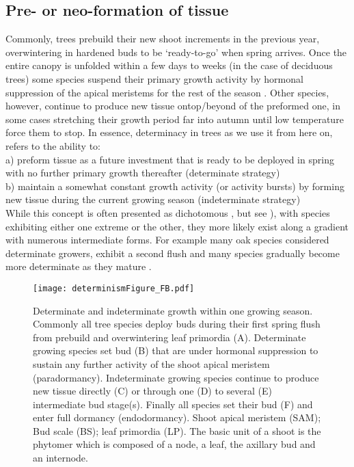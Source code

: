 \documentclass{article}
\begin{document}
	\subsection*{Pre- or neo-formation of tissue}
	Commonly, trees prebuild their new shoot increments in the previous year, overwintering in hardened buds to be `ready-to-go' when spring arrives. Once the entire canopy is unfolded within a few days to weeks (in the case of deciduous trees) some species suspend their primary growth activity by hormonal suppression of the apical meristems for the rest of the season \citep[paradormancy,][]{langEndoParaEcodormancy1987}.  Other species, however, continue to produce new tissue ontop/beyond of the preformed one, in some cases stretching their growth period far into autumn until low temperature force them to stop. In essence, determinacy in trees as we use it from here on, refers to the ability to:\\
	a) preform tissue as a future investment that is ready to be deployed in spring with no further primary growth thereafter (determinate strategy)\\
	b) maintain a somewhat constant growth activity (or activity bursts) by forming new tissue during the current growing season (indeterminate strategy)\\

While this concept is often presented as dichotomous \citep{kozlowskiGrowthControlWoody1997, lechowiczWhyTemperateDeciduous1984a}, but see \citealp{kikuzawaLeafSurvivalWoody1983, damascosBudCompositionBranching2005}), with species exhibiting either one extreme or the other, they more likely exist along a gradient with numerous intermediate forms. For example many oak species considered determinate growers, exhibit a second flush and many species gradually become more determinate as they mature \citep{borchertConceptJuvenilityWoody1976, heuretOntogeneticTrendsMorphological2006}.
	
								\begin{figure}
								\centering
								\texttt{[image: determinismFigure\_FB.pdf]} 
								\caption{Determinate and indeterminate growth within one growing season. Commonly all tree species deploy buds during their first spring flush from prebuild and overwintering leaf primordia (A). Determinate growing species set bud (B) that are under hormonal suppression to sustain any further activity of the shoot apical meristem (paradormancy). Indeterminate growing species continue to produce new tissue directly (C) or through one (D) to several (E) intermediate bud stage(s). Finally all species set their bud (F) and enter full dormancy (endodormancy). Shoot apical meristem (SAM); Bud scale (BS); leaf primordia (LP). The basic unit of a shoot is the phytomer which is composed of a node, a leaf, the axillary bud and an internode.}
								\label{fig:fig_2xxx}
								\end{figure}
	
\end{document}

